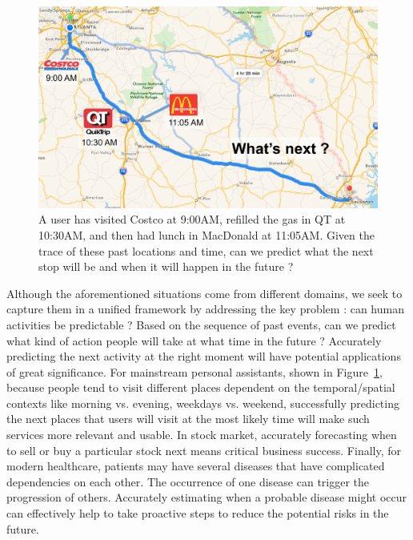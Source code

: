 \documentclass{sig-alternate-05-2015}
\begin{document}
\begin{figure}
	\includegraphics[width=\columnwidth]{fig1}
	\caption{A user has visited Costco at 9:00AM, refilled the gas in QT at 10:30AM, and then had lunch in MacDonald at 11:05AM. Given the trace of these past locations and time, can we predict what the next stop will be and when it will happen in the future ? \label{demo}} 
\end{figure}
Although the aforementioned situations come from different domains, we seek to capture them in a unified framework by addressing the key problem : can human activities be predictable ? Based on the sequence of past events, can we predict what kind of action people will take at what time in the future ? Accurately predicting the next activity at the right moment will have potential applications of great significance. For mainstream personal assistants, shown in Figure~\ref{demo}, because people tend to visit different places dependent on the temporal/spatial contexts like morning vs. evening, weekdays vs. weekend, successfully predicting the next places that users will visit at the most likely time will make such services more relevant and usable. In stock market, accurately forecasting when to sell or buy a particular stock next means critical business success. Finally, for modern healthcare, patients may have several diseases that have complicated dependencies on each other. The occurrence of one disease can trigger the progression of others. Accurately estimating when a probable disease might occur can effectively help to take proactive steps to reduce the potential risks in the future. 
\end{document}
